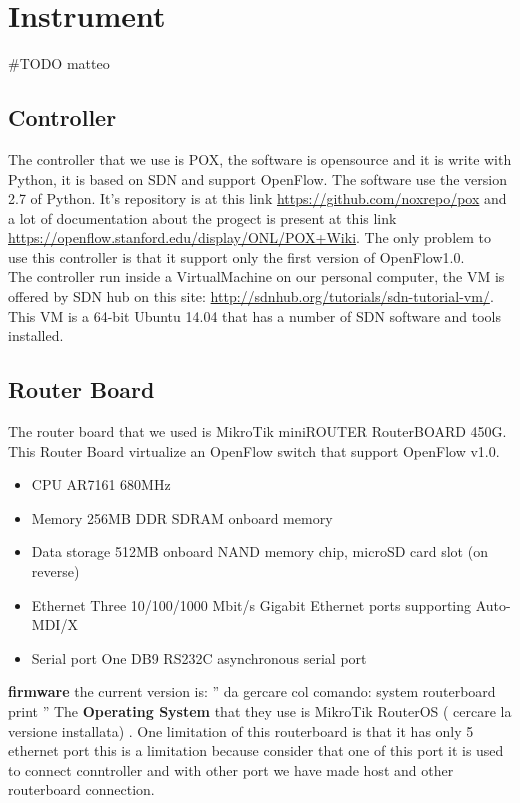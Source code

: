 \documentclass[conference,10pt]{IEEEtran}
\begin{document}
\section{Instrument}\label{sec:instrument}
\#TODO matteo
  \subsection{Controller}
  The controller that we use is POX, the software is opensource and it is write with Python, it is based on SDN and support OpenFlow.
  The software use the version 2.7 of Python.
  It's repository is at this link \url{https://github.com/noxrepo/pox} and a lot of documentation about the progect 
  is present at this link \url{https://openflow.stanford.edu/display/ONL/POX+Wiki}.
  The only problem to use this controller is that it support only the first version of OpenFlow1.0.
  \\
  The controller run inside a VirtualMachine on our personal computer, 
  the VM is offered by SDN hub on this site: \url{http://sdnhub.org/tutorials/sdn-tutorial-vm/}. 
  This VM is a 64-bit Ubuntu 14.04 that has a number of SDN software and tools installed.
  \subsection{Router Board}
  The router board that we used is MikroTik miniROUTER RouterBOARD 450G. This Router Board virtualize an OpenFlow switch that support 
  OpenFlow v1.0\cite{routerboard_doc}. 
  \begin{itemize}
   \item CPU		AR7161 680MHz
   \item Memory		256MB DDR SDRAM onboard memory
   \item Data storage	512MB onboard NAND memory chip, microSD card slot (on reverse)
   \item Ethernet 	Three 10/100/1000 Mbit/s Gigabit Ethernet ports supporting Auto-MDI/X
   \item Serial port 	One DB9 RS232C asynchronous serial port
  \end{itemize}
  \textbf{firmware} the current version is: '' da gercare col comando: system routerboard print ''
  \newline
  The \textbf{Operating System} that they use is MikroTik RouterOS ( cercare la versione installata) \cite{routeboard_software}.
  \newline
  One limitation of this routerboard is that it has only 5 ethernet port this is a limitation because consider that one of this port it is 
  used to connect conntroller and with other port we have made host and other routerboard connection.
  
\end{document}
